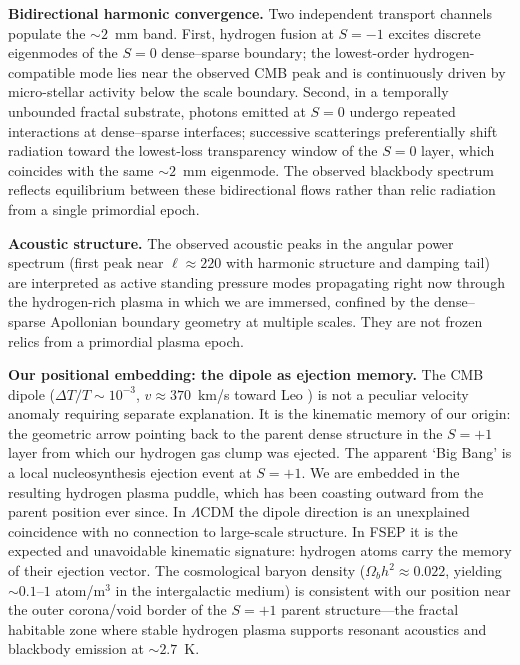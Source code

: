 \documentclass[11pt,letterpaper]{article}
\begin{document}
\medskip
\noindent\textbf{Bidirectional harmonic convergence.}
Two independent transport channels populate the $\sim2$~mm band. First, hydrogen
fusion at $S{=}{-1}$ excites discrete eigenmodes of the $S{=}0$ dense--sparse
boundary; the lowest-order hydrogen-compatible mode lies near the observed CMB peak
and is continuously driven by micro-stellar activity below the scale boundary.
Second, in a temporally unbounded fractal substrate, photons emitted at $S{=}0$
undergo repeated interactions at dense--sparse interfaces; successive scatterings
preferentially shift radiation toward the lowest-loss transparency window of the
$S{=}0$ layer, which coincides with the same $\sim2$~mm eigenmode. The observed
blackbody spectrum reflects equilibrium between these bidirectional flows rather
than relic radiation from a single primordial epoch.

\medskip
\noindent\textbf{Acoustic structure.}
The observed acoustic peaks in the angular power spectrum (first peak near
$\ell \approx 220$ with harmonic structure and damping tail) are interpreted as
active standing pressure modes propagating right now through the hydrogen-rich
plasma in which we are immersed, confined by the dense--sparse Apollonian boundary
geometry at multiple scales. They are not frozen relics from a primordial plasma
epoch.

\medskip
\noindent\textbf{Our positional embedding: the dipole as ejection memory.}
The CMB dipole ($\Delta T/T \sim 10^{-3}$, $v \approx 370$~km/s toward Leo
\cite{Lineweaver1996, Planck2014}) is not a peculiar velocity anomaly requiring
separate explanation. It is the kinematic memory of our origin: the geometric arrow
pointing back to the parent dense structure in the $S{=}+1$ layer from which our
hydrogen gas clump was ejected. The apparent `Big Bang' is a local nucleosynthesis
ejection event at $S{=}+1$. We are embedded in the resulting hydrogen plasma
puddle, which has been coasting outward from the parent position ever since. In
$\Lambda$CDM the dipole direction is an unexplained coincidence with no connection
to large-scale structure. In FSEP it is the expected and unavoidable kinematic
signature: hydrogen atoms carry the memory of their ejection vector. The
cosmological baryon density ($\Omega_b h^2 \approx 0.022$, yielding
$\sim 0.1$--$1$ atom/m$^3$ in the intergalactic medium) is consistent with our
position near the outer corona/void border of the $S{=}+1$ parent structure---the
fractal habitable zone where stable hydrogen plasma supports resonant acoustics and
blackbody emission at $\sim 2.7$~K.
\end{document}
